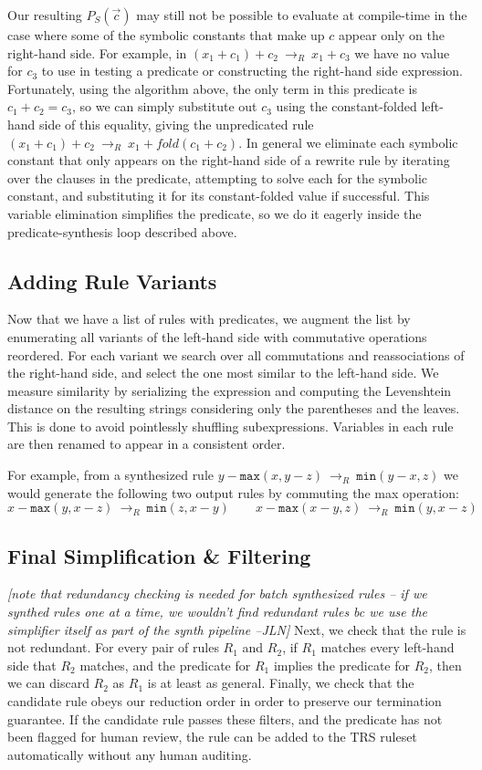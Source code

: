 \documentclass[acmsmall,review]{acmart}\settopmatter{printfolios=true,printccs=false,printacmref=false}
\newcommand{\jln}[1]{\textcolor{uwpurple}{\textit{[{#1} --JLN]}}}
\newcommand{\hmax}[0]{\texttt{max}}
\newcommand{\hmin}[0]{\texttt{min}}
\newcommand{\rewrites}[0]{\:\rightarrow_{R}\:}
\begin{document}
Our resulting $P_S(\vec{c})$ may still not be possible to evaluate at
compile-time in the case where some of the symbolic constants that
make up $c$ appear only on the right-hand side. For example, in $(x_1
+ c_1) + c_2 \rewrites x_1 + c_3$ we have no value for $c_3$ to use
in testing a predicate or constructing the right-hand side
expression. Fortunately, using the algorithm above, the only term in
this predicate is $c_1 + c_2 = c_3$, so we can simply substitute out
$c_3$ using the constant-folded left-hand side of this equality,
giving the unpredicated rule $(x_1 + c_1) + c_2 \rewrites x_1 +
fold(c_1 + c_2)$. In general we eliminate each symbolic constant that
only appears on the right-hand side of a rewrite rule by iterating
over the clauses in the predicate, attempting to solve each for the
symbolic constant, and substituting it for its constant-folded value
if successful. This variable elimination simplifies the predicate, so
we do it eagerly inside the predicate-synthesis loop described above.

\subsection{Adding Rule Variants}
\label{sec:rulevariants}
Now that we have a list of rules with predicates, we augment the list
by enumerating all variants of the left-hand side with commutative
operations reordered. For each variant we search over all commutations
and reassociations of the right-hand side, and select the one most
similar to the left-hand side. We measure similarity by serializing
the expression and computing the Levenshtein distance on the resulting
strings considering only the parentheses and the leaves. This is done
to avoid pointlessly shuffling subexpressions. Variables in each rule
are then renamed to appear in a consistent order.

For example, from a synthesized rule $y - \hmax(x, y - z) \rewrites \hmin(y - x, z)$ we would generate the following two
output rules by commuting the max operation:
\[
x - \hmax(y, x - z) \rewrites \hmin(z, x - y) \qquad x - \hmax(x - y, z) \rewrites \hmin(y, x - z)
\]

\subsection{Final Simplification \& Filtering}
\label{sec:filtering}
\jln{note that redundancy checking is needed for batch synthesized rules -- 
if we synthed rules one at a time, we wouldn't find redundant rules bc we
use the simplifier itself as part of the synth pipeline}
Next, we check that the rule is not redundant. For every pair of rules
$R_1$ and $R_2$, if $R_1$ matches every left-hand side that $R_2$
matches, and the predicate for $R_1$ implies the predicate for $R_2$,
then we can discard $R_2$ as $R_1$ is at least as general. Finally, we
check that the candidate rule obeys our reduction order in order to
preserve our termination guarantee. If the candidate rule passes these
filters, and the predicate has not been flagged for human review, the
rule can be added to the TRS ruleset automatically without any human
auditing.
\end{document}

